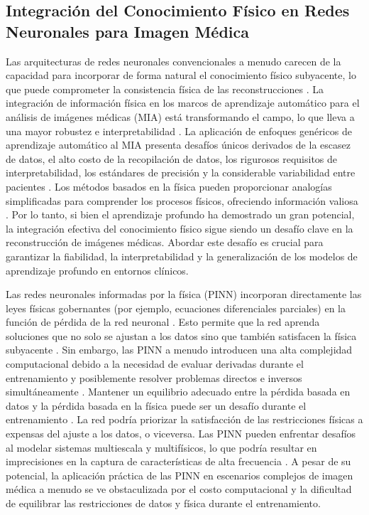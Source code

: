 \subsection{Integración del Conocimiento Físico en Redes Neuronales para Imagen Médica}\label{sec:integracion_fisica}

Las arquitecturas de redes neuronales convencionales a menudo carecen de la capacidad para incorporar de forma natural el conocimiento físico subyacente, lo que puede comprometer la consistencia física de las reconstrucciones \cite{resolution_enhancement_2024}. La integración de información física en los marcos de aprendizaje automático para el análisis de imágenes médicas (MIA) está transformando el campo, lo que lleva a una mayor robustez e interpretabilidad \cite{pinns_medical_2024}. La aplicación de enfoques genéricos de aprendizaje automático al MIA presenta desafíos únicos derivados de la escasez de datos, el alto costo de la recopilación de datos, los rigurosos requisitos de interpretabilidad, los estándares de precisión y la considerable variabilidad entre pacientes \cite{pinns_medical_2024}. Los métodos basados en la física pueden proporcionar analogías simplificadas para comprender los procesos físicos, ofreciendo información valiosa \cite{pinns_medical_2024}. Por lo tanto, si bien el aprendizaje profundo ha demostrado un gran potencial, la integración efectiva del conocimiento físico sigue siendo un desafío clave en la reconstrucción de imágenes médicas. Abordar este desafío es crucial para garantizar la fiabilidad, la interpretabilidad y la generalización de los modelos de aprendizaje profundo en entornos clínicos.

Las redes neuronales informadas por la física (PINN) incorporan directamente las leyes físicas gobernantes (por ejemplo, ecuaciones diferenciales parciales) en la función de pérdida de la red neuronal \cite{resolution_enhancement_2024}. Esto permite que la red aprenda soluciones que no solo se ajustan a los datos sino que también satisfacen la física subyacente \cite{physics_informed_polymers_2025}. Sin embargo, las PINN a menudo introducen una alta complejidad computacional debido a la necesidad de evaluar derivadas durante el entrenamiento y posiblemente resolver problemas directos e inversos simultáneamente \cite{resolution_enhancement_2024}. Mantener un equilibrio adecuado entre la pérdida basada en datos y la pérdida basada en la física puede ser un desafío durante el entrenamiento \cite{hauptmann_2024}. La red podría priorizar la satisfacción de las restricciones físicas a expensas del ajuste a los datos, o viceversa. Las PINN pueden enfrentar desafíos al modelar sistemas multiescala y multifísicos, lo que podría resultar en imprecisiones en la captura de características de alta frecuencia \cite{pinns_geoengineering_2024}. A pesar de su potencial, la aplicación práctica de las PINN en escenarios complejos de imagen médica a menudo se ve obstaculizada por el costo computacional y la dificultad de equilibrar las restricciones de datos y física durante el entrenamiento.

